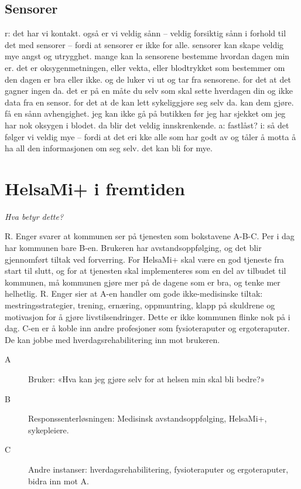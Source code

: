 \subsection{Sensorer}
r: det har vi kontakt. også er vi veldig sånn -- veldig forsiktig sånn i forhold til det med sensorer -- fordi at sensorer er ikke for alle. sensorer kan skape veldig mye angst og utrygghet. mange kan la sensorene bestemme hvordan dagen min er. det er oksygenmetningen, eller vekta, eller blodtrykket som bestemmer om den dagen er bra eller ikke. og de luker vi ut og tar fra sensorene. for det at det gagner ingen da. det er på en måte du selv som skal sette hverdagen din og ikke data fra en sensor. for det at de kan lett sykeliggjøre seg selv da. kan dem gjøre. få en sånn avhengighet. jeg kan ikke gå på butikken før jeg har sjekket om jeg har nok oksygen i blodet. da blir det veldig innskrenkende. 
a: fastlåst?
i: så det følger vi veldig mye -- fordi at det eri kke alle som har godt av og tåler å motta å ha all den informasjonen om seg selv. det kan bli for mye.

\section{HelsaMi+ i fremtiden}

\textit{ Hva betyr dette?}

R. Enger svarer at kommunen ser på tjenesten som bokstavene A-B-C. Per i dag har kommunen bare B-en. Brukeren har avstandsoppfølging, og det blir
gjennomført tiltak ved forverring. For HelsaMi+ skal være en god tjeneste fra start til slutt, og for at tjenesten skal
implementeres som en del av tilbudet til kommunen, må kommunen gjøre mer på de dagene som er bra,
og tenke mer helhetlig. R. Enger sier at A-en handler om gode ikke-medisinske tiltak: mestringsstrategier, trening, ernæring,
oppmuntring, klapp på skuldrene og motivasjon for å gjøre livstilsendringer. Dette er ikke kommunen flinke nok på i dag. C-en er å koble
inn andre profesjoner som fysioteraputer og ergoteraputer. De kan jobbe med hverdagsrehabilitering inn mot brukeren.

\begin{description}
\item[A] Bruker: «Hva kan jeg gjøre selv for at helsen min skal bli bedre?»
\item[B] Responssenterløsningen: Medisinsk avstandsoppfølging, HelsaMi+, sykepleiere.
\item[C] Andre instanser: hverdagsrehabilitering, fysioteraputer og ergoteraputer, bidra inn mot A.
\end{description}

